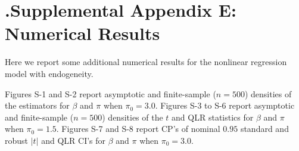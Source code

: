 \documentclass[12pt,titlepage,final,oneside,letterpaper]{article}
\begin{document}
\section{ \hspace{-0.34in}\textbf{.}\hspace{0.2in}Supplemental Appendix E:
Numerical Results}

\hspace{0.25in}Here we report some additional numerical results for the
nonlinear regression model with endogeneity.

Figures S-1 and S-2 report asymptotic and finite-sample ($n=500$) densities
of the estimators for $\beta $ and $\pi $ when $\pi _{0}=3.0.$ Figures S-3
to S-6 report asymptotic and finite-sample ($n=500$) densities of the $t$
and QLR statistics for $\beta $ and $\pi $ when $\pi _{0}=1.5.$ Figures S-7
and S-8 report CP's of nominal $0.95$ standard and robust $|t|$ and QLR CI's
for $\beta $ and $\pi $ when $\pi _{0}=3.0.$



\end{document}
